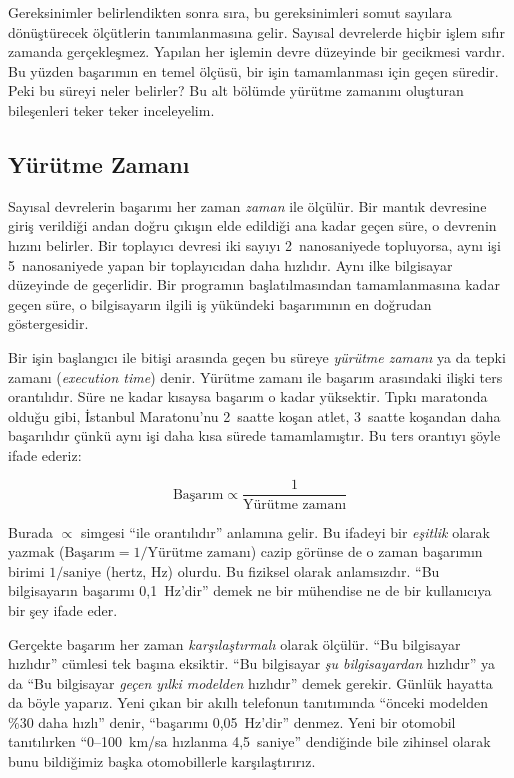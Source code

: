 Gereksinimler belirlendikten sonra sıra, bu gereksinimleri somut sayılara dönüştürecek ölçütlerin tanımlanmasına gelir. Sayısal devrelerde hiçbir işlem sıfır zamanda gerçekleşmez. Yapılan her işlemin devre düzeyinde bir gecikmesi vardır. Bu yüzden başarımın en temel ölçüsü, bir işin tamamlanması için geçen süredir. Peki bu süreyi neler belirler? Bu alt bölümde yürütme zamanını oluşturan bileşenleri teker teker inceleyelim.

\subsection{Yürütme Zamanı}
\label{subsec:yurutme-zamani}

Sayısal devrelerin başarımı her zaman \emph{zaman} ile ölçülür. Bir mantık devresine giriş verildiği andan doğru çıkışın elde edildiği ana kadar geçen süre, o devrenin hızını belirler. Bir toplayıcı devresi iki sayıyı 2~nanosaniyede topluyorsa, aynı işi 5~nanosaniyede yapan bir toplayıcıdan daha hızlıdır. Aynı ilke bilgisayar düzeyinde de geçerlidir. Bir programın başlatılmasından tamamlanmasına kadar geçen süre, o bilgisayarın ilgili iş yükündeki başarımının en doğrudan göstergesidir.

Bir işin başlangıcı ile bitişi arasında geçen bu süreye \emph{yürütme zamanı} ya da tepki zamanı (\emph{execution time}) denir. Yürütme zamanı ile başarım arasındaki ilişki ters orantılıdır. Süre ne kadar kısaysa başarım o kadar yüksektir. Tıpkı maratonda olduğu gibi, İstanbul Maratonu'nu 2~saatte koşan atlet, 3~saatte koşandan daha başarılıdır çünkü aynı işi daha kısa sürede tamamlamıştır. Bu ters orantıyı şöyle ifade ederiz:

\begin{equation}
\text{Başarım} \propto \frac{1}{\text{Yürütme zamanı}}
\label{eq:basarim}
\end{equation}

Burada $\propto$ simgesi ``ile orantılıdır'' anlamına gelir. Bu ifadeyi bir \emph{eşitlik} olarak yazmak ($\text{Başarım} = 1/\text{Yürütme zamanı}$) cazip görünse de o zaman başarımın birimi $1/\text{saniye}$ (hertz, Hz) olurdu. Bu fiziksel olarak anlamsızdır. ``Bu bilgisayarın başarımı 0,1~Hz'dir'' demek ne bir mühendise ne de bir kullanıcıya bir şey ifade eder.

Gerçekte başarım her zaman \emph{karşılaştırmalı} olarak ölçülür. ``Bu bilgisayar hızlıdır'' cümlesi tek başına eksiktir. ``Bu bilgisayar \emph{şu bilgisayardan} hızlıdır'' ya da ``Bu bilgisayar \emph{geçen yılki modelden} hızlıdır'' demek gerekir. Günlük hayatta da böyle yaparız. Yeni çıkan bir akıllı telefonun tanıtımında ``önceki modelden \%30 daha hızlı'' denir, ``başarımı 0,05~Hz'dir'' denmez. Yeni bir otomobil tanıtılırken ``0--100~km/sa hızlanma 4,5~saniye'' dendiğinde bile zihinsel olarak bunu bildiğimiz başka otomobillerle karşılaştırırız.

